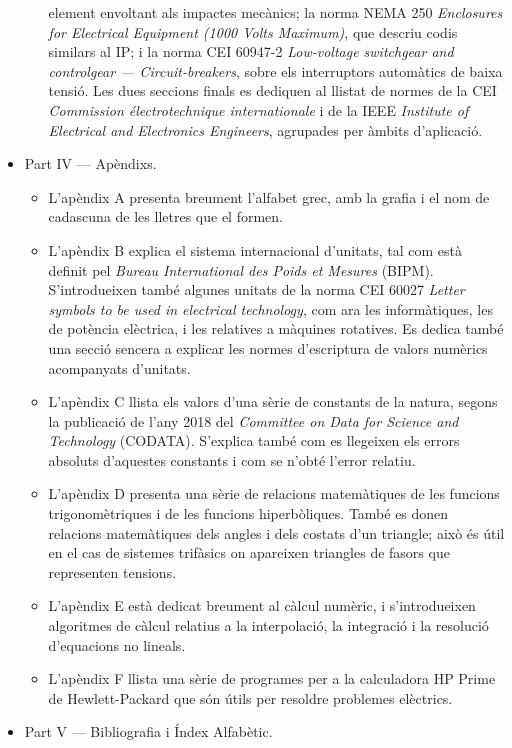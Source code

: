 \begin{itemize}
\begin{itemize}
			element envoltant als impactes mecànics; la norma
			NEMA 250 \textit{Enclosures for Electrical Equipment (1000 Volts Maximum)}, que descriu codis similars al IP; i la norma CEI 60947-2 \textit{Low-voltage switchgear and controlgear --- Circuit-breakers}, sobre els interruptors automàtics de baixa tensió. Les dues seccions finals es dediquen al llistat de normes de la CEI \textit{Commission électrotechnique internationale} i de la IEEE \textit{Institute of Electrical and Electronics Engineers}, agrupades per àmbits d'aplicació.
		\end{itemize}
		\item Part IV --- Apèndixs. 
		\begin{itemize}
			\item L'apèndix A presenta breument l'alfabet grec, amb la grafia i el nom de cadascuna de les lletres que el formen.
			\item L'apèndix B explica el sistema internacional d'unitats, tal com està definit pel \textit{Bureau International des Poids et Mesures} (BIPM). S'introdueixen també algunes unitats de la norma CEI 60027 \textit{Letter symbols to be used in electrical technology}, com ara les informàtiques, les de potència elèctrica, i les relatives a màquines rotatives. Es dedica també una secció sencera a explicar les normes d'escriptura de valors numèrics acompanyats d'unitats.
			\item L'apèndix C llista els valors d'una sèrie de constants de la natura, segons la  publicació
			de l’any 2018 del \textit{Committee on Data for
			Science and Technology} (CODATA). S'explica també com es llegeixen els errors absoluts d'aquestes constants i com se n'obté l'error relatiu.
			\item L'apèndix D presenta una sèrie de relacions matemàtiques de les funcions trigonomètriques i de les funcions hiperbòliques. També es donen relacions matemàtiques dels angles i dels costats d'un triangle; això és útil en el cas de sistemes trifàsics on apareixen triangles de fasors que representen tensions.
			\item L'apèndix E està dedicat breument al càlcul numèric, i s'introdueixen algoritmes de càlcul relatius a la interpolació, la integració i la resolució d'equacions no lineals.
			\item L'apèndix F llista una sèrie de programes per a la calculadora \textsf{HP Prime} de Hewlett-Packard que són útils per resoldre problemes elèctrics. 
		\end{itemize}
		\item Part V --- Bibliografia i  Índex Alfabètic.
	\end{itemize}
		

